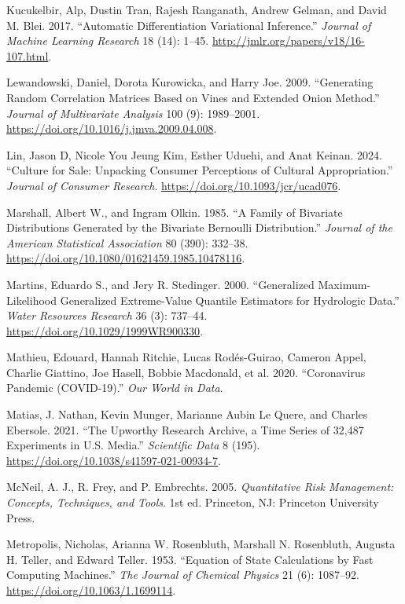 \documentclass[
  11pt,
  letterpaper,
]{scrbook}
\newlength{\cslhangindent}
\newenvironment{CSLReferences}[2] %
 {\begin{list}{}{%
  \setlength{\itemindent}{0pt}
  \setlength{\leftmargin}{0pt}
  \setlength{\parsep}{0pt}
  \ifodd #1
   \setlength{\leftmargin}{\cslhangindent}
   \setlength{\itemindent}{-1\cslhangindent}
  \fi
  \setlength{\itemsep}{#2\baselineskip}}}
 {\end{list}}
\theoremstyle{definition}
\theoremstyle{definition}
\theoremstyle{definition}
\theoremstyle{plain}
\theoremstyle{plain}
\theoremstyle{plain}
\theoremstyle{remark}
\begin{document}
\begin{CSLReferences}{1}{0}
Kucukelbir, Alp, Dustin Tran, Rajesh Ranganath, Andrew Gelman, and David
M. Blei. 2017. {``Automatic Differentiation Variational Inference.''}
\emph{Journal of Machine Learning Research} 18 (14): 1--45.
\url{http://jmlr.org/papers/v18/16-107.html}.

Lewandowski, Daniel, Dorota Kurowicka, and Harry Joe. 2009.
{``Generating Random Correlation Matrices Based on Vines and Extended
Onion Method.''} \emph{Journal of Multivariate Analysis} 100 (9):
1989--2001. \url{https://doi.org/10.1016/j.jmva.2009.04.008}.

Lin, Jason D, Nicole You Jeung Kim, Esther Uduehi, and Anat Keinan.
2024. {``Culture for Sale: Unpacking Consumer Perceptions of Cultural
Appropriation.''} \emph{Journal of Consumer Research}.
\url{https://doi.org/10.1093/jcr/ucad076}.

Marshall, Albert W., and Ingram Olkin. 1985. {``A Family of Bivariate
Distributions Generated by the Bivariate {B}ernoulli Distribution.''}
\emph{Journal of the American Statistical Association} 80 (390):
332--38. \url{https://doi.org/10.1080/01621459.1985.10478116}.

Martins, Eduardo S., and Jery R. Stedinger. 2000. {``Generalized
Maximum-Likelihood Generalized Extreme-Value Quantile Estimators for
Hydrologic Data.''} \emph{Water Resources Research} 36 (3): 737--44.
\url{https://doi.org/10.1029/1999WR900330}.

Mathieu, Edouard, Hannah Ritchie, Lucas Rodés-Guirao, Cameron Appel,
Charlie Giattino, Joe Hasell, Bobbie Macdonald, et al. 2020.
{``Coronavirus Pandemic (COVID-19).''} \emph{Our World in Data}.

Matias, J. Nathan, Kevin Munger, Marianne Aubin Le Quere, and Charles
Ebersole. 2021. {``The {U}pworthy {R}esearch {A}rchive, a Time Series of
32,487 Experiments in {U.S.} Media.''} \emph{Scientific Data} 8 (195).
\url{https://doi.org/10.1038/s41597-021-00934-7}.

McNeil, A. J., R. Frey, and P. Embrechts. 2005. \emph{Quantitative Risk
Management: Concepts, Techniques, and Tools}. 1st ed. Princeton, NJ:
Princeton University Press.

Metropolis, Nicholas, Arianna W. Rosenbluth, Marshall N. Rosenbluth,
Augusta H. Teller, and Edward Teller. 1953. {``Equation of State
Calculations by Fast Computing Machines.''} \emph{The Journal of
Chemical Physics} 21 (6): 1087--92.
\url{https://doi.org/10.1063/1.1699114}.


\end{CSLReferences}
\end{document}
